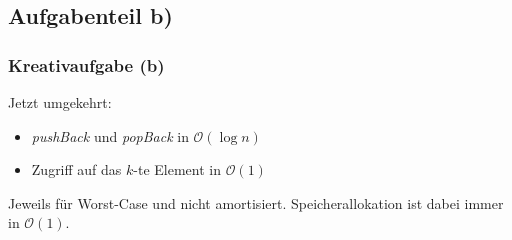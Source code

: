 \documentclass[18pt]{beamer}
\begin{document}
\subsection{Aufgabenteil b)}

\begin{frame}
	\frametitle{Kreativaufgabe (b)}
	Jetzt umgekehrt:

	\begin{itemize}
		\item \emph{pushBack} und \emph{popBack} in $\mathcal{O}(\log{n})$
		\item Zugriff auf das $k$-te Element in $\mathcal{O}(1)$
	\end{itemize}

	Jeweils für Worst-Case und nicht amortisiert.
	Speicherallokation ist dabei immer in $\mathcal{O}(1)$.
\end{frame}
\end{document}
